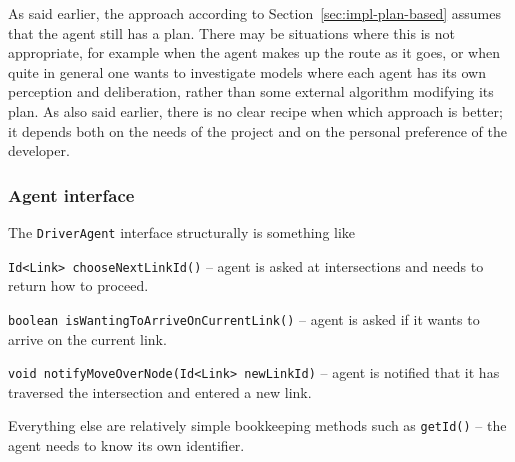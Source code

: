As said earlier, the approach according to Section~\ref{sec:impl-plan-based} assumes that the agent still has a plan.  There may be situations where this is not appropriate, for example when the agent makes up the route as it goes, or when quite in general one wants to investigate models where each agent has its own perception and deliberation, rather than some external algorithm modifying its plan.  As also said earlier, there is no clear recipe when which approach is better; it depends both on the needs of the project and on the personal preference of the developer.

\subsubsection{Agent interface}

The \verb$DriverAgent$ interface structurally is something like
\begin{compactitem}

\item \verb$Id<Link> chooseNextLinkId()$ -- agent is asked at intersections and needs to return how to proceed.




\item \verb$boolean isWantingToArriveOnCurrentLink()$ -- agent is asked if it wants to arrive on the current link.

\item \verb$void notifyMoveOverNode(Id<Link> newLinkId)$ -- agent is notified that it has traversed the intersection and entered a new link.

\end{compactitem}
Everything else are relatively simple bookkeeping methods such as \verb$getId()$ -- the agent needs to know its own identifier.

